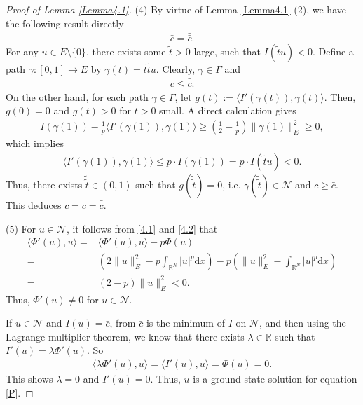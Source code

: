 \documentclass[12pt,a4paper,reqno]{amsart}
\numberwithin{equation}{section}
\begin{document}
\begin{proof}[Proof of Lemma \ref{Lemma4.1}]
(4)
By virtue of Lemma \ref{Lemma4.1} (2), we have the following result directly
\begin{equation*}
\begin{aligned}
\bar{c}=\bar{\bar{c}}.
\end{aligned}
\end{equation*}
For any $u\in E\setminus\{0\}$,
there exists some $\tilde{t}>0$ large,
such that $I(\tilde{t}u)<0$.
Define a path $\gamma:[0, 1]\to E$ by $\gamma(t) = t\tilde{t}u$.
Clearly, $\gamma\in\Gamma$ and
\begin{equation*}
\begin{aligned}
c\leqslant \bar{\bar{c}}.
\end{aligned}
\end{equation*}
On the other hand, for each path $\gamma\in\Gamma$,
let $g(t):=\langle I'(\gamma(t)),\gamma(t)\rangle$.
Then, $g(0)=0$ and $g(t)>0$ for $t>0$ small. A direct calculation gives
\begin{equation*}
\begin{aligned}
I(\gamma(1))
-\frac{1}{p}\langle I'(\gamma(1)),\gamma(1)\rangle
\geqslant\left(\frac{1}{2}-\frac{1}{p}\right)\|\gamma(1)\|_{E}^{2}
\geqslant 0,
\end{aligned}
\end{equation*}
which implies
\begin{equation*}
\begin{aligned}
\langle I'(\gamma(1)),\gamma(1)\rangle
\leqslant p\cdot I(\gamma(1))
=p\cdot I(\tilde{t}u)<0.
\end{aligned}
\end{equation*}
Thus, there exists $\tilde{\tilde{t}} \in(0,1)$ such that $g(\tilde{\tilde{t}}) = 0$, i.e. $\gamma(\tilde{\tilde{t}})\in \mathcal{N}$ and $c\geqslant \bar{c}$.
This deduces
$c=\bar{c}=\bar{\bar{c}}$.

(5)
For $u\in \mathcal{N}$, it follows from \eqref{4.1} and \eqref{4.2} that
\begin{equation*}
\begin{aligned}
\langle\Phi'(u),u\rangle
=&\langle\Phi'(u),u\rangle-p\Phi(u)\\
=&\left(2\|u\|_{E}^{2}-p\int_{\mathbb{R}^{N}}|u|^{p}\mathrm{d}x\right)
-p\left(\|u\|_{E}^{2}
-\int_{\mathbb{R}^{N}}|u|^{p}\mathrm{d}x\right)\\
=&(2-p)\|u\|_{E}^{2}
<0.
\end{aligned}
\end{equation*}
Thus, $\Phi'(u)\not=0$ for $u\in \mathcal{N}$.

If $u\in \mathcal{N}$ and $I(u)=\bar{c}$,
from $\bar{c}$ is the minimum of $I$ on $\mathcal{N}$,
and then using the Lagrange multiplier theorem, we know that there exists $\lambda\in \mathbb{R}$ such that $I'(u)=\lambda \Phi'(u)$. So
\begin{equation*}
\begin{aligned}
\langle \lambda \Phi'(u),u\rangle =\langle I'(u),u\rangle=\Phi(u)=0.
\end{aligned}
\end{equation*}
This shows $\lambda=0$ and $I'(u)=0$. Thus, $u$ is a ground state solution for equation \eqref{P}.
\end{proof}
\end{document}
